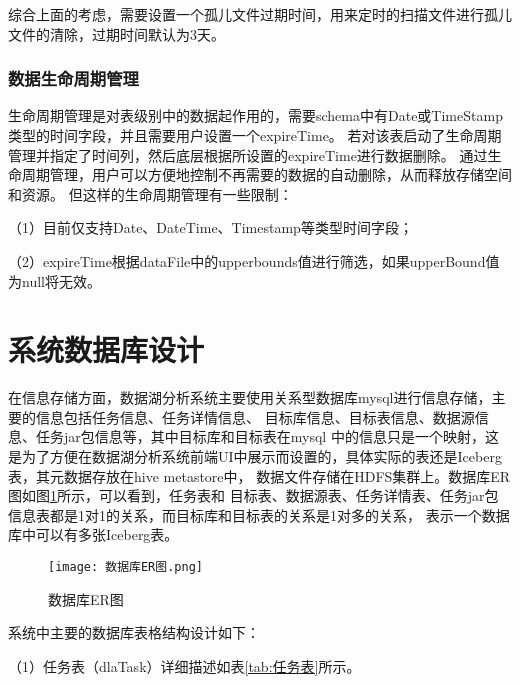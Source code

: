 综合上面的考虑，需要设置一个孤儿文件过期时间，用来定时的扫描文件进行孤儿文件的清除，过期时间默认为3天。

\subsubsection{数据生命周期管理}

⽣命周期管理是对表级别中的数据起作用的，需要schema中有Date或TimeStamp类型的时间字段，并且需要用户设置一个expireTime。
若对该表启动了⽣命周期管理并指定了时间列，然后底层根据所设置的expireTime进⾏数据删除。
通过生命周期管理，用户可以方便地控制不再需要的数据的自动删除，从而释放存储空间和资源。
但这样的⽣命周期管理有一些限制：

（1）⽬前仅⽀持Date、DateTime、Timestamp等类型时间字段；

（2）expireTime根据dataFile中的upperbounds值进⾏筛选，如果upperBound值为null将⽆效。

\section{系统数据库设计}

在信息存储方面，数据湖分析系统主要使用关系型数据库mysql进行信息存储，主要的信息包括任务信息、任务详情信息、
目标库信息、目标表信息、数据源信息、任务jar包信息等，其中目标库和目标表在mysql
中的信息只是一个映射，这是为了方便在数据湖分析系统前端UI中展示而设置的，具体实际的表还是Iceberg表，其元数据存放在hive metastore中，
数据文件存储在HDFS集群上。数据库ER图如图\ref{fig:数据库ER图}所示，可以看到，任务表和
目标表、数据源表、任务详情表、任务jar包信息表都是1对1的关系，而目标库和目标表的关系是1对多的关系，
表示一个数据库中可以有多张Iceberg表。

\begin{figure}[H]
  \centering
  \texttt{[image: 数据库ER图.png]}
  \caption{数据库ER图}
  \label{fig:数据库ER图}
\end{figure}

系统中主要的数据库表格结构设计如下：

（1）任务表（dlaTask）详细描述如表\ref{tab:任务表}所示。

